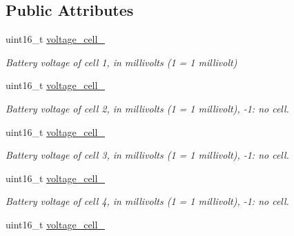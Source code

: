 \subsection*{Public Attributes}
\begin{DoxyCompactItemize}
\item 
\hypertarget{struct____mavlink__battery__status__t_adaeb25259ebf6a9a53a9cb4edc20b314}{uint16\+\_\+t \hyperlink{struct____mavlink__battery__status__t_adaeb25259ebf6a9a53a9cb4edc20b314}{voltage\+\_\+cell\+\_}}\label{struct____mavlink__battery__status__t_adaeb25259ebf6a9a53a9cb4edc20b314}

\begin{DoxyCompactList}\small\item\em Battery voltage of cell 1, in millivolts (1 = 1 millivolt) \end{DoxyCompactList}\item 
\hypertarget{struct____mavlink__battery__status__t_ab785f30613bb2406144f9d923dd0f44c}{uint16\+\_\+t \hyperlink{struct____mavlink__battery__status__t_ab785f30613bb2406144f9d923dd0f44c}{voltage\+\_\+cell\+\_}}\label{struct____mavlink__battery__status__t_ab785f30613bb2406144f9d923dd0f44c}

\begin{DoxyCompactList}\small\item\em Battery voltage of cell 2, in millivolts (1 = 1 millivolt), -\/1\+: no cell. \end{DoxyCompactList}\item 
\hypertarget{struct____mavlink__battery__status__t_addc83e20e1b3a4f56d9718cdfa0b94f9}{uint16\+\_\+t \hyperlink{struct____mavlink__battery__status__t_addc83e20e1b3a4f56d9718cdfa0b94f9}{voltage\+\_\+cell\+\_}}\label{struct____mavlink__battery__status__t_addc83e20e1b3a4f56d9718cdfa0b94f9}

\begin{DoxyCompactList}\small\item\em Battery voltage of cell 3, in millivolts (1 = 1 millivolt), -\/1\+: no cell. \end{DoxyCompactList}\item 
\hypertarget{struct____mavlink__battery__status__t_afdd7db92c49d50189e101c78d120b64b}{uint16\+\_\+t \hyperlink{struct____mavlink__battery__status__t_afdd7db92c49d50189e101c78d120b64b}{voltage\+\_\+cell\+\_}}\label{struct____mavlink__battery__status__t_afdd7db92c49d50189e101c78d120b64b}

\begin{DoxyCompactList}\small\item\em Battery voltage of cell 4, in millivolts (1 = 1 millivolt), -\/1\+: no cell. \end{DoxyCompactList}\item 
\hypertarget{struct____mavlink__battery__status__t_a3a077490266e57c0f0e63d81079bfc86}{uint16\+\_\+t \hyperlink{struct____mavlink__battery__status__t_a3a077490266e57c0f0e63d81079bfc86}{voltage\+\_\+cell\+\_}}\label{struct____mavlink__battery__status__t_a3a077490266e57c0f0e63d81079bfc86}


\end{DoxyCompactItemize}
